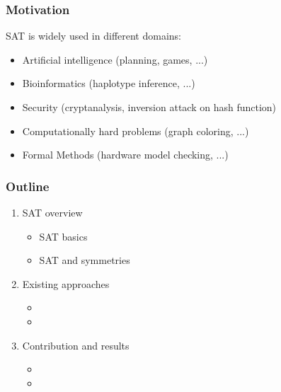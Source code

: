 \documentclass{beamer}
\begin{document}
\begin{frame}

\frametitle{Motivation}
SAT is widely used in different domains:

\begin{itemize}
	\item Artificial intelligence (planning, games, ...)
	\item Bioinformatics (haplotype inference, ...)
	\item Security (cryptanalysis, inversion attack on hash function)
	\item Computationally hard problems (graph coloring, ...)
	\item Formal Methods (hardware model checking, ...)
\end{itemize}

\end{frame}
\begin{frame}
\frametitle{Outline}
\begin{enumerate}
	\item \textcolor{UPMCEngagementBlueB}{SAT overview}
	\begin{itemize}
		\item[] SAT basics
		\item[] SAT and symmetries
	\end{itemize}
\vspace{5pt}
	\item \textcolor{UPMCEngagementBlueB}{Existing approaches}
	\begin{itemize}
		\item[] \phantom{Static symmetry breaking}
		\item[] \phantom{Dynamic symmetry breaking}
	\end{itemize}
\vspace{5pt}
	\item \textcolor{UPMCEngagementBlueB}{Contribution and results} 
	\begin{itemize}
		\item[] \phantom{CDCL [Sym]}
		\item[] \phantom{Combination of different approaches}
	\end{itemize}
\end{enumerate}
\end{frame}
\end{document}
